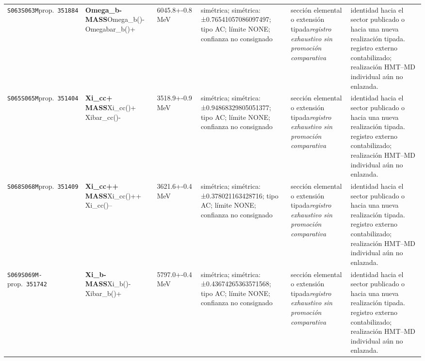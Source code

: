 \begin{landscape}
\begin{longtable}{L{1.85cm}L{4.45cm}L{2.35cm}L{4.05cm}L{3.35cm}L{7.15cm}}
\texttt{S063}\newline \texttt{S063M}\newline prop.\ \texttt{351884} & \textbf{Omega\_\allowbreak{}b- MASS}\newline Omega\_\allowbreak{}b()- \textbar{}\allowbreak{} Omegabar\_\allowbreak{}b()+ & 6045.8+-0.8\,MeV & simétrica; simétrica: ±0.76541057086097497; tipo AC; límite NONE; confianza no consignado & sección elemental o extensión tipada\newline \emph{registro exhaustivo sin promoción comparativa} & identidad hacia el sector publicado o hacia una nueva realización tipada. registro externo contabilizado; realización HMT--MD individual aún no enlazada. \\
\texttt{S065}\newline \texttt{S065M}\newline prop.\ \texttt{351404} & \textbf{Xi\_\allowbreak{}cc+ MASS}\newline Xi\_\allowbreak{}cc()+ \textbar{}\allowbreak{} Xibar\_\allowbreak{}cc()- & 3518.9+-0.9\,MeV & simétrica; simétrica: ±0.94868329805051377; tipo AC; límite NONE; confianza no consignado & sección elemental o extensión tipada\newline \emph{registro exhaustivo sin promoción comparativa} & identidad hacia el sector publicado o hacia una nueva realización tipada. registro externo contabilizado; realización HMT--MD individual aún no enlazada. \\
\texttt{S068}\newline \texttt{S068M}\newline prop.\ \texttt{351409} & \textbf{Xi\_\allowbreak{}cc++ MASS}\newline Xi\_\allowbreak{}cc()++ \textbar{}\allowbreak{} Xi\_\allowbreak{}cc()-- & 3621.6+-0.4\,MeV & simétrica; simétrica: ±0.378021163428716; tipo AC; límite NONE; confianza no consignado & sección elemental o extensión tipada\newline \emph{registro exhaustivo sin promoción comparativa} & identidad hacia el sector publicado o hacia una nueva realización tipada. registro externo contabilizado; realización HMT--MD individual aún no enlazada. \\
\texttt{S069}\newline \texttt{S069M-}\newline prop.\ \texttt{351742} & \textbf{Xi\_\allowbreak{}b- MASS}\newline Xi\_\allowbreak{}b()- \textbar{}\allowbreak{} Xibar\_\allowbreak{}b()+ & 5797.0+-0.4\,MeV & simétrica; simétrica: ±0.43674265363571568; tipo AC; límite NONE; confianza no consignado & sección elemental o extensión tipada\newline \emph{registro exhaustivo sin promoción comparativa} & identidad hacia el sector publicado o hacia una nueva realización tipada. registro externo contabilizado; realización HMT--MD individual aún no enlazada. \\

\end{longtable}
\end{landscape}
